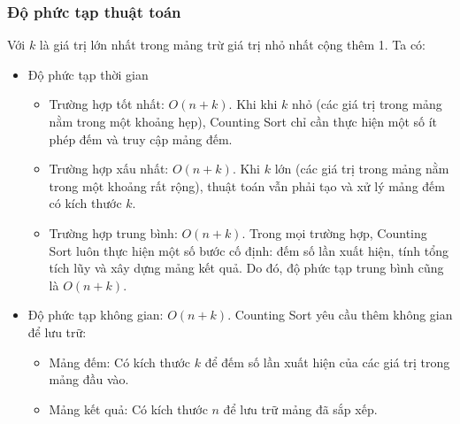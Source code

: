 \begin{center}
\end{center}

\subsubsection{Độ phức tạp thuật toán}

Với $k$ là giá trị lớn nhất trong mảng trừ giá trị nhỏ nhất cộng thêm 1. Ta có:

\begin{itemize}
	\item Độ phức tạp thời gian
	\begin{itemize}[label=$\circ$]
		\item Trường hợp tốt nhất: $O\left(n+k\right)$. Khi khi $k$ nhỏ 
		(các giá trị trong mảng nằm trong một khoảng hẹp), Counting Sort 
		chỉ cần thực hiện một số ít phép đếm và truy cập mảng đếm.
		\item Trường hợp xấu nhất: $O\left(n+k\right)$. Khi $k$ lớn (các 
		giá trị trong mảng nằm trong một khoảng rất rộng), thuật toán 
		vẫn phải tạo và xử lý mảng đếm có kích thước $k$.
		\item Trường hợp trung bình: $O\left(n+k\right)$. Trong mọi 
		trường hợp, Counting Sort luôn thực hiện một số bước cố định: 
		đếm số lần xuất hiện, tính tổng tích lũy và xây dựng mảng kết quả. 
		Do đó, độ phức tạp trung bình cũng là $O\left(n+k\right)$. 
	\end{itemize}
	\item Độ phức tạp không gian: $O\left(n+k\right)$. Counting Sort 
	yêu cầu thêm không gian để lưu trữ:
	\begin{itemize}[label=$\circ$]
		\item Mảng đếm: Có kích thước $k$ để đếm số lần xuất hiện của 
		các giá trị trong mảng đầu vào.
		\item Mảng kết quả: Có kích thước $n$ để lưu trữ mảng đã sắp xếp.
	\end{itemize}
\end{itemize}